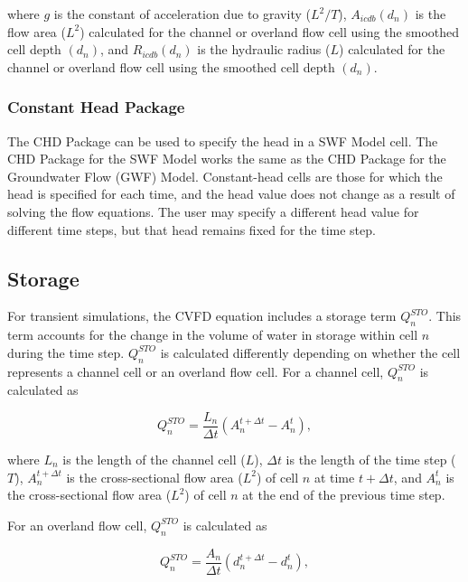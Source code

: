 \documentclass[fleqn]{article}
\begin{document}
\noindent where $g$ is the constant of acceleration due to gravity ($L^2/T$), $A_{icdb} (d_n)$ is the flow area ($L^2$) calculated for the channel or overland flow cell using the smoothed cell depth $(d_n)$, and $R_{icdb} (d_n)$ is the hydraulic radius ($L$) calculated for the channel or overland flow cell using the smoothed cell depth $(d_n)$.

\subsubsection{Constant Head Package}

The CHD Package can be used to specify the head in a SWF Model cell.  The CHD Package for the SWF Model works the same as the CHD Package for the Groundwater Flow (GWF) Model.  Constant-head cells are those for which the head is specified for each time, and the head value does not change as a result of solving the flow equations. The user may specify a different head value for different time steps, but that head remains fixed for the time step.

\subsection{Storage}

For transient simulations, the CVFD equation includes a storage term $Q_n^{STO}$.  This term accounts for the change in the volume of water in storage within cell $n$ during the time step.  $Q_n^{STO}$ is calculated differently depending on whether the cell represents a channel cell or an overland flow cell.  For a channel cell, $Q_n^{STO}$ is calculated as

\begin{equation}
  Q_{n}^{STO} = \frac{L_n}{\Delta t}\left ( A_n^{t + \Delta t} - A_n^t \right ),
\label{eqn:qsto1d}
\end{equation}

\noindent where $L_n$ is the length of the channel cell ($L$), $\Delta t$ is the length of the time step ($T$), $A_n^{t + \Delta t}$ is the cross-sectional flow area ($L^2$) of cell $n$ at time $t + \Delta t$, and $A_n^t$ is the cross-sectional flow area ($L^2$) of cell $n$ at the end of the previous time step.

For an overland flow cell, $Q_n^{STO}$ is calculated as

\begin{equation}
  Q_{n}^{STO} = \frac{A_n}{\Delta t}\left ( d_n^{t + \Delta t} - d_n^t \right ),
\label{eqn:qsto2d}
\end{equation}
\end{document}
